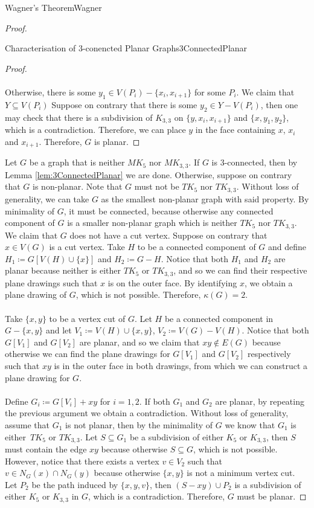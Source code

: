 \documentclass[math]{amznotes}
\theoremstyle{remark}
\newcommand{\0}{\mathbf{0}}
\newcommand{\1}{\mathbf{1}}
\begin{document}
\begin{thmbox}{Wagner's Theorem}{Wagner}
\begin{proof}
\begin{lembox}{Characterisation of $3$-conencted Planar Graphs}{3ConnectedPlanar}
\begin{proof}
                \\\\
                Otherwise, there is some $y_1 \in V(P_i) - \{x_i, x_{i + 1}\}$ for some $P_i$. We claim that $Y \subseteq V(P_i)$ Suppose on contrary that there is some $y_2 \in Y - V(P_i)$, then one may check that there is a subdivision of $K_{3, 3}$ on $\{y, x_i, x_{i + 1}\}$ and $\{x, y_1, y_2\}$, which is a contradiction. Therefore, we can place $y$ in the face containing $x$, $x_i$ and $x_{i + 1}$. Therefore, $G$ is planar.
            \end{proof}
        \end{lembox}
        Let $G$ be a graph that is neither $MK_5$ nor $MK_{3, 3}$. If $G$ is $3$-connected, then by Lemma \ref{lem:3ConnectedPlanar} we are done. Otherwise, suppose on contrary that $G$ is non-planar. Note that $G$ must not be $TK_5$ nor $TK_{3, 3}$. Without loss of generality, we can take $G$ as the smallest non-planar graph with said property. By minimality of $G$, it must be connected, because otherwise any connected component of $G$ is a smaller non-planar graph which is neither $TK_5$ nor $TK_{3, 3}$. We claim that $G$ does not have a cut vertex. Suppose on contrary that $x \in V(G)$ is a cut vertex. Take $H$ to be a connected component of $G$ and define $H_1 \coloneqq G[V(H) \cup \{x\}]$ and $H_2 \coloneqq G - H$. Notice that both $H_1$ and $H_2$ are planar because neither is either $TK_5$ or $TK_{3, 3}$, and so we can find their respective plane drawings such that $x$ is on the outer face. By identifying $x$, we obtain a plane drawing of $G$, which is not possible. Therefore, $\kappa(G) = 2$. 
        \\\\
        Take $\{x, y\}$ to be a vertex cut of $G$. Let $H$ be a connected component in $G - \{x, y\}$ and let $V_1 \coloneqq V(H) \cup \{x, y\}$, $V_2 \coloneqq V(G) - V(H)$. Notice that both $G[V_1]$ and $G[V_2]$ are planar, and so we claim that $xy \notin E(G)$ because otherwise we can find the plane drawings for $G[V_1]$ and $G[V_2]$ respectively such that $xy$ is in the outer face in both drawings, from which we can construct a plane drawing for $G$. 
        \\\\
        Define $G_i \coloneqq G[V_i] + xy$ for $i = 1, 2$. If both $G_1$ and $G_2$ are planar, by repeating the previous argument we obtain a contradiction. Without loss of generality, assume that $G_1$ is not planar, then by the minimality of $G$ we know that $G_1$ is either~$TK_5$ or $TK_{3, 3}$. Let $S \subseteq G_1$ be a subdivision of either $K_5$ or $K_{3, 3}$, then $S$ must contain the edge $xy$ because otherwise $S \subseteq G$, which is not possible. However, notice that there exists a vertex $v \in V_2$ such that $v \in N_G(x) \cap N_G(y)$ because otherwise $\{x, y\}$ is not a minimum vertex cut. Let $P_2$ be the path induced by $\{x, y, v\}$, then $(S - xy) \cup P_2$ is a subdivision of either $K_5$ or $K_{3, 3}$ in $G$, which is a contradiction. Therefore, $G$ must be planar.
    \end{proof}
\end{thmbox}
\end{document}

